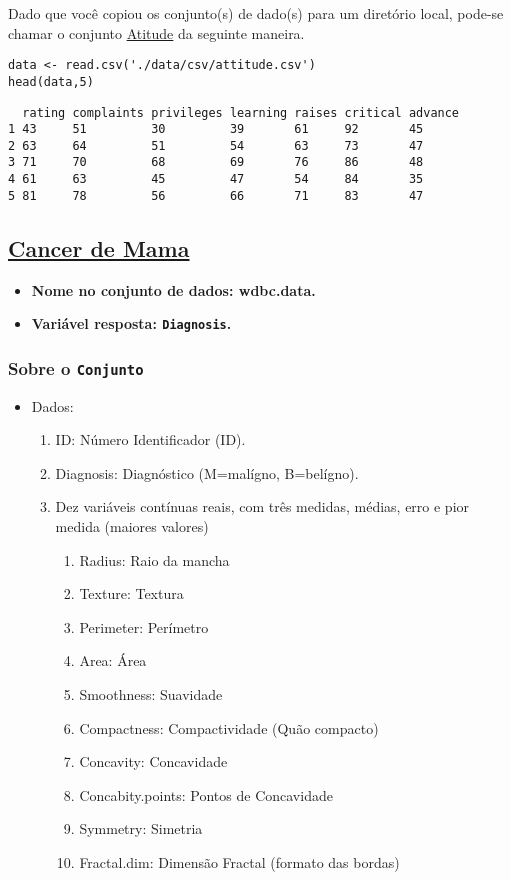 \documentclass[11pt]{article}
\begin{document}
Dado que você copiou os conjunto(s) de dado(s) para um diretório
local, pode-se chamar o conjunto \href{https://drive.google.com/file/d/1rKj4NPD61bWKD6HBC4fux2Eit6CNEKwr/view?usp=sharing}{Atitude} da seguinte maneira.

\begin{verbatim}
data <- read.csv('./data/csv/attitude.csv')
head(data,5)
\end{verbatim}

\begin{verbatim}
  rating complaints privileges learning raises critical advance
1 43     51         30         39       61     92       45     
2 63     64         51         54       63     73       47     
3 71     70         68         69       76     86       48     
4 61     63         45         47       54     84       35     
5 81     78         56         66       71     83       47     
\end{verbatim}
\clearpage

\subsection{\href{https://archive.ics.uci.edu/ml/datasets/Breast+Cancer+Wisconsin+\%28Diagnostic\%29}{Cancer de Mama}}
\label{sec:org4583062}
\begin{itemize}
\item \textbf{Nome no conjunto de dados: \textbf{wdbc.data}.}
\item \textbf{Variável resposta: \texttt{Diagnosis}.}
\end{itemize}
\subsubsection{Sobre o \texttt{Conjunto}}
\label{sec:org8065128}
\begin{itemize}
\item Dados:
\begin{enumerate}
\item ID: Número Identificador (ID).
\item Diagnosis: Diagnóstico (M=malígno, B=belígno).
\item Dez variáveis contínuas reais, com três medidas, médias, erro e pior medida (maiores valores)
\begin{enumerate}
\item Radius: Raio da mancha
\item Texture: Textura
\item Perimeter: Perímetro
\item Area: Área
\item Smoothness: Suavidade
\item Compactness: Compactividade (Quão compacto)
\item Concavity: Concavidade
\item Concabity.points: Pontos de Concavidade
\item Symmetry: Simetria
\item Fractal.dim: Dimensão Fractal (formato das bordas)
\end{enumerate}
\end{enumerate}
\end{itemize}
\end{document}
